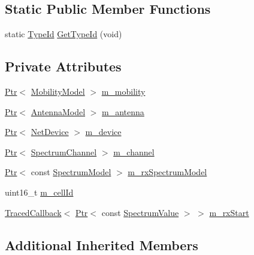 \subsection*{Static Public Member Functions}
\begin{DoxyCompactItemize}
\item 
static \hyperlink{classns3_1_1TypeId}{Type\+Id} \hyperlink{classns3_1_1LteSimpleSpectrumPhy_a1cf14b8e117f6472e4b6314da3667aef}{Get\+Type\+Id} (void)
\end{DoxyCompactItemize}
\subsection*{Private Attributes}
\begin{DoxyCompactItemize}
\item 
\hyperlink{classns3_1_1Ptr}{Ptr}$<$ \hyperlink{classns3_1_1MobilityModel}{Mobility\+Model} $>$ \hyperlink{classns3_1_1LteSimpleSpectrumPhy_ae0e7df7b872200128f8a1c0e57ececf5}{m\+\_\+mobility}
\item 
\hyperlink{classns3_1_1Ptr}{Ptr}$<$ \hyperlink{classns3_1_1AntennaModel}{Antenna\+Model} $>$ \hyperlink{classns3_1_1LteSimpleSpectrumPhy_a5dbaa23683c0efcf68397fc7e757e949}{m\+\_\+antenna}
\item 
\hyperlink{classns3_1_1Ptr}{Ptr}$<$ \hyperlink{classns3_1_1NetDevice}{Net\+Device} $>$ \hyperlink{classns3_1_1LteSimpleSpectrumPhy_a9c5b9614796e4bdf1226aadf039007ff}{m\+\_\+device}
\item 
\hyperlink{classns3_1_1Ptr}{Ptr}$<$ \hyperlink{classns3_1_1SpectrumChannel}{Spectrum\+Channel} $>$ \hyperlink{classns3_1_1LteSimpleSpectrumPhy_a0c62622961539a822f714d6e5c0a2629}{m\+\_\+channel}
\item 
\hyperlink{classns3_1_1Ptr}{Ptr}$<$ const \hyperlink{classns3_1_1SpectrumModel}{Spectrum\+Model} $>$ \hyperlink{classns3_1_1LteSimpleSpectrumPhy_aa5236d4951e4205e8d97f8599f58631f}{m\+\_\+rx\+Spectrum\+Model}
\item 
uint16\+\_\+t \hyperlink{classns3_1_1LteSimpleSpectrumPhy_af6e426d2c0597d44141e642c8b61b924}{m\+\_\+cell\+Id}
\item 
\hyperlink{classns3_1_1TracedCallback}{Traced\+Callback}$<$ \hyperlink{classns3_1_1Ptr}{Ptr}$<$ const \hyperlink{classns3_1_1SpectrumValue}{Spectrum\+Value} $>$ $>$ \hyperlink{classns3_1_1LteSimpleSpectrumPhy_a62dd25ce9f68081bdf7f5d8f20c834a3}{m\+\_\+rx\+Start}
\end{DoxyCompactItemize}
\subsection*{Additional Inherited Members}


